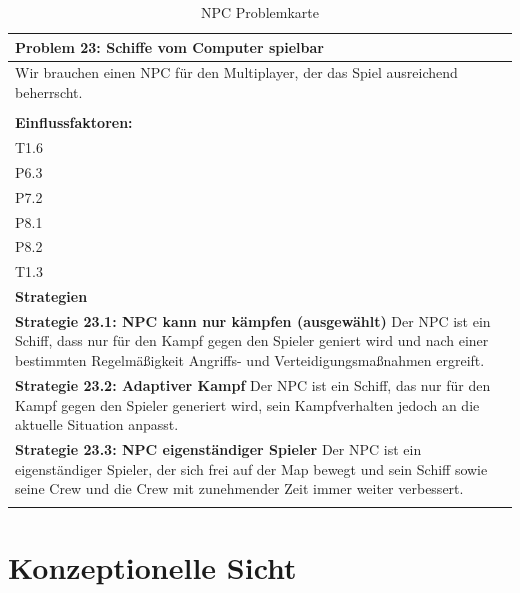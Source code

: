 \documentclass[fontsize=12pt,paper=a4,twoside]{scrartcl}
\begin{document}
\begin{table}[H]
    \centering
    \begin{tabular}{|p{15cm}|}
    \hline
          \textbf{Problem 23: Schiffe vom Computer spielbar}  \\ \hline
	Wir brauchen einen NPC für den Multiplayer, der das Spiel ausreichend beherrscht. \\
         \\ \hline
          \textbf{Einflussfaktoren: } \\
	T1.6 \\
	P6.3 \\
	P7.2 \\
	P8.1 \\
	P8.2 \\
	T1.3 \\
          \hline
          \textbf{Strategien} \\ \hline
            {}          
           \label{strategie:23.1}     
          \textbf{Strategie 23.1: NPC kann nur kämpfen (ausgewählt)} Der NPC ist ein Schiff, dass nur für den Kampf gegen den Spieler geniert wird und nach einer bestimmten Regelmäßigkeit Angriffs- und Verteidigungsmaßnahmen ergreift.  \\        
  {}          
           \label{strategie:23.2}              
          \textbf{Strategie 23.2: Adaptiver Kampf} Der NPC ist ein Schiff, das nur für den Kampf gegen den Spieler generiert wird, sein Kampfverhalten jedoch an die aktuelle Situation anpasst.   \\
	 {}          
           \label{strategie:23.3}     
          \textbf{Strategie 23.3: NPC eigenständiger Spieler} Der NPC ist ein eigenständiger Spieler, der sich frei auf der Map bewegt und sein Schiff sowie seine Crew und die Crew mit zunehmender Zeit immer weiter verbessert. \\ 
	 \\ \hline
    \end{tabular}

    \caption{NPC Problemkarte}
    \label{tab:ProblemKarte23}
\end{table}



\section{Konzeptionelle Sicht} \label{sec:konzeptionell}
\end{document}
